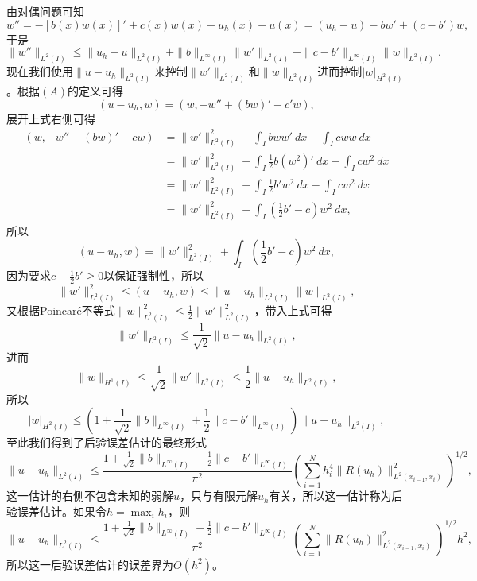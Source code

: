 \documentclass[a4paper,10pt]{ctexart}
\begin{document}
由对偶问题可知
\[
    w'' = -[b(x)w(x)]' + c(x)w(x) + u_h(x) - u(x) = (u_h - u) - bw' + (c-b')w,
\]
于是
\[
    \| w'' \|_{L^2(I)} \leqslant \| u_h - u \|_{L^2(I)} + \| b \|_{L^\infty(I)} \| w' \|_{L^2(I)} + \| c-b' \|_{L^\infty(I)}\| w \|_{L^2(I)}.
\]
现在我们使用$ \| u-u_h \|_{L^2(I)} $来控制$ \| w' \|_{L^2(I)} $和$ \| w \|_{L^2(I)} $进而控制$ | w |_{H^2(I)} $。根据$ (A) $的定义可得
\[
    (u-u_h,w) = (w, -w'' + (bw)' - c'w),
\]
展开上式右侧可得
\[
    \begin{aligned}
        (w, -w'' + (bw)' - cw) 
        &= \| w' \|_{L^2(I)}^2 - \int_I bww'\ dx - \int_I cww\ dx\\
        &= \| w' \|_{L^2(I)}^2 + \int_I \frac{1}{2}b(w^2)'\ dx-\int_Icw^2\ dx\\
        &= \| w' \|_{L^2(I)}^2 + \int_I \frac{1}{2}b'w^2\ dx-\int_Icw^2\ dx\\
        &= \| w' \|_{L^2(I)}^2 + \int_I (\frac{1}{2}b'-c)w^2\ dx,
    \end{aligned}
\]
所以
\[
    (u-u_h,w) = \| w' \|_{L^2(I)}^2 + \int_I (\frac{1}{2}b'-c)w^2\ dx,
\]
因为要求$ c-\frac{1}{2}b'\geqslant 0 $以保证强制性，所以
\begin{equation}
    \| w' \|_{L^2(I)}^2 \leqslant (u-u_h,w)  \leqslant \| u-u_h \|_{L^2(I)} \| w \|_{L^2(I)},
\end{equation}
又根据Poincaré不等式$ \| w \|_{L^2(I)}^2 \leqslant \frac{1}{2}\| w' \|_{L^2(I)}^2 $，带入上式可得
\begin{equation}
    \| w' \|_{L^2(I)} \leqslant \frac{1}{\sqrt{2} }\| u-u_h \|_{L^2(I)},
\end{equation}
进而
\begin{equation}
    \| w \|_{H^1(I)} \leqslant \frac{1}{\sqrt{2}}\| w' \|_{L^2(I)} \leqslant \frac{1}{2}\| u-u_h \|_{L^2(I)},
\end{equation}
所以
\begin{equation}
    | w |_{H^2(I)} \leqslant (1+\frac{1}{\sqrt{2}}\| b \|_{L^\infty(I)}+\frac{1}{2}\| c-b' \|_{L^\infty(I)})\| u-u_h \|_{L^2(I)},
\end{equation}
至此我们得到了后验误差估计的最终形式
\begin{equation}
    \| u - u_h \|_{L^2(I)} \leqslant \frac{1+\frac{1}{\sqrt{2}}\| b \|_{L^\infty(I)}+\frac{1}{2}\| c-b' \|_{L^\infty(I)}}{\pi^2}\left( \sum_{i=1}^{N}h_i^4 \| R(u_h) \|_{L^2(x_{i-1},x_i)}^2 \right)^{1 / 2},
\end{equation}
这一估计的右侧不包含未知的弱解$ u $，只与有限元解$ u_h $有关，所以这一估计称为后验误差估计。如果令$ h=\max_i h_i $，则
\begin{equation}
    \| u - u_h \|_{L^2(I)} \leqslant \frac{1+\frac{1}{\sqrt{2}}\| b \|_{L^\infty(I)}+\frac{1}{2}\| c-b' \|_{L^\infty(I)}}{\pi^2}\left( \sum_{i=1}^{N}\| R(u_h) \|_{L^2(x_{i-1},x_i)}^2 \right)^{1 / 2}h^2,
\end{equation}
所以这一后验误差估计的误差界为$ O(h^2) $。
\end{document}
